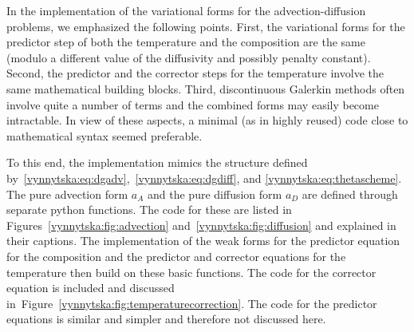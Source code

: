 In the implementation of the variational forms for the
advection-diffusion problems, we emphasized the following
points. First, the variational forms for the predictor step of both
the temperature and the composition are the same (modulo a different
value of the diffusivity and possibly penalty constant).  Second, the
predictor and the corrector steps for the temperature involve the same
mathematical building blocks. Third, discontinuous Galerkin methods
often involve quite a number of terms and the combined forms may
easily become intractable. In view of these aspects, a minimal (as in
highly reused) code close to mathematical syntax seemed preferable.

To this end, the implementation mimics the structure defined
by~\eqref{vynnytska:eq:dgadv},~\eqref{vynnytska:eq:dgdiff}, and
\eqref{vynnytska:eq:thetascheme}. The pure advection form $a_A$ and
the pure diffusion form $a_D$ are defined through separate python
functions. The code for these are listed in
Figures~\ref{vynnytska:fig:advection}
and~\ref{vynnytska:fig:diffusion} and explained in their captions. The
implementation of the weak forms for the predictor equation for the
composition and the predictor and corrector equations for the
temperature then build on these basic functions. The code for the
corrector equation is included and discussed
in~Figure~\ref{vynnytska:fig:temperaturecorrection}. The code for the
predictor equations is similar and simpler and therefore not discussed
here.

